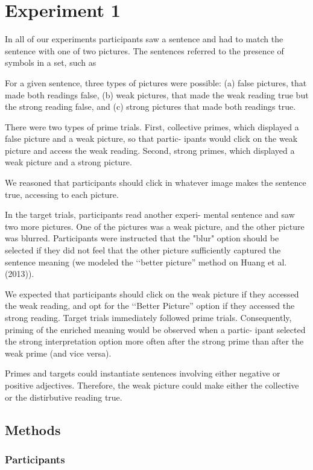 \documentclass[a4paper]{article}
\begin{document}
\section{Experiment 1}
In all of our experiments participants saw a sentence and had to match the sentence with one of two pictures. The sentences referred to the presence of symbols in a set, such as 

For a given sentence, three types of pictures were possible: (a) false pictures, that made both readings false, (b) weak pictures, that made the weak reading true but the strong reading false, and (c) strong pictures that made both readings true. 


There were two types of prime trials. First, collective primes, which displayed a false picture and a weak picture, so that partic- ipants would click on the weak picture and access the weak reading. Second, strong primes, which displayed a weak picture and a strong picture. 

We reasoned that participants should click in whatever image makes the sentence true, accessing to each picture. 

In the target trials, participants read another experi- mental sentence and saw two more pictures. One of the pictures was a weak picture, and the other picture was blurred. Participants were instructed that the "blur" option should be selected if they did not feel that the other picture sufficiently captured the sentence meaning (we modeled the ‘‘better picture” method on Huang et al. (2013)).


We expected that participants should click on the weak picture if they accessed the weak reading, and opt for the ‘‘Better Picture” option if they accessed the strong reading. Target trials immediately followed prime trials. Consequently, priming of the enriched meaning would be observed when a partic- ipant selected the strong interpretation option more often after the strong prime than after the weak prime (and vice versa).

Primes and targets could instantiate sentences involving either negative or positive adjectives. Therefore, the weak picture could make either the collective or the distirbutive reading true. 

\subsection{Methods}

\subsubsection{Participants}
\end{document}
